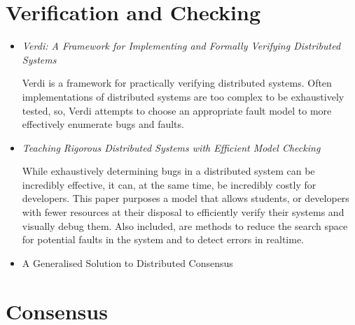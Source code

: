 \documentclass{article}
\begin{document}
\tableofcontents{}

\section{Verification and Checking}

\begin{itemize}
	\item
	\textit{Verdi: A Framework for Implementing and Formally Verifying Distributed Systems} \cite{Verdi}

	Verdi is a framework for practically verifying distributed systems. Often implementations of distributed systems are
	too complex to be exhaustively tested, so, Verdi attempts to choose an appropriate fault model to more effectively enumerate bugs and faults.

	\item
	\textit{Teaching Rigorous Distributed Systems with Efficient Model Checking} \cite{MichaelWAET2019}

	While exhaustively determining bugs in a distributed system can be incredibly effective, it can, at the same time, be incredibly costly for developers.
	This paper purposes a model that allows students, or developers with fewer resources at their disposal to efficiently verify their systems and visually debug them.
	Also included, are methods to reduce the search space for potential faults in the system and to detect errors in realtime.

	\item{A Generalised Solution to Distributed Consensus \cite{HowardGeneralized}}
\end{itemize}

\section{Consensus}
\end{document}
